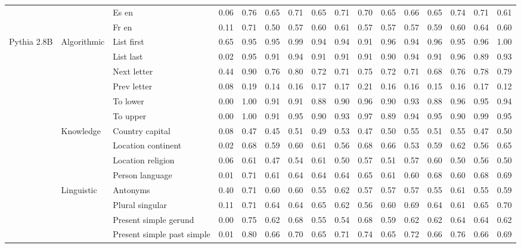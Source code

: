 \begin{center}
\begin{longtable}{lllrrrrrrrrrrrrr}
 &  & Es en & 0.06 & 0.76 & 0.65 & 0.71 & 0.65 & 0.71 & 0.70 & 0.65 & 0.66 & 0.65 & 0.74 & 0.71 & 0.61 \\
 &  & Fr en & 0.11 & 0.71 & 0.50 & 0.57 & 0.60 & 0.61 & 0.57 & 0.57 & 0.57 & 0.59 & 0.60 & 0.64 & 0.60 \\
\cline{1-16} \cline{2-16}
\multirow[t]{18}{*}{Pythia 2.8B} & \multirow[t]{6}{*}{Algorithmic} & List first & 0.65 & 0.95 & 0.95 & 0.99 & 0.94 & 0.94 & 0.91 & 0.96 & 0.94 & 0.96 & 0.95 & 0.96 & 1.00 \\
 &  & List last & 0.02 & 0.95 & 0.91 & 0.94 & 0.91 & 0.91 & 0.91 & 0.90 & 0.94 & 0.91 & 0.96 & 0.89 & 0.93 \\
 &  & Next letter & 0.44 & 0.90 & 0.76 & 0.80 & 0.72 & 0.71 & 0.75 & 0.72 & 0.71 & 0.68 & 0.76 & 0.78 & 0.79 \\
 &  & Prev letter & 0.08 & 0.19 & 0.14 & 0.16 & 0.17 & 0.17 & 0.21 & 0.16 & 0.16 & 0.15 & 0.16 & 0.17 & 0.12 \\
 &  & To lower & 0.00 & 1.00 & 0.91 & 0.91 & 0.88 & 0.90 & 0.96 & 0.90 & 0.93 & 0.88 & 0.96 & 0.95 & 0.94 \\
 &  & To upper & 0.00 & 1.00 & 0.91 & 0.95 & 0.90 & 0.93 & 0.97 & 0.89 & 0.94 & 0.95 & 0.90 & 0.99 & 0.95 \\
\cline{2-16}
 & \multirow[t]{4}{*}{Knowledge} & Country capital & 0.08 & 0.47 & 0.45 & 0.51 & 0.49 & 0.53 & 0.47 & 0.50 & 0.55 & 0.51 & 0.55 & 0.47 & 0.50 \\
 &  & Location continent & 0.02 & 0.68 & 0.59 & 0.60 & 0.61 & 0.56 & 0.68 & 0.66 & 0.53 & 0.59 & 0.62 & 0.56 & 0.65 \\
 &  & Location religion & 0.06 & 0.61 & 0.47 & 0.54 & 0.61 & 0.50 & 0.57 & 0.51 & 0.57 & 0.60 & 0.50 & 0.56 & 0.50 \\
 &  & Person language & 0.01 & 0.71 & 0.61 & 0.64 & 0.64 & 0.64 & 0.65 & 0.61 & 0.60 & 0.68 & 0.60 & 0.68 & 0.69 \\
\cline{2-16}
 & \multirow[t]{4}{*}{Linguistic} & Antonyms & 0.40 & 0.71 & 0.60 & 0.60 & 0.55 & 0.62 & 0.57 & 0.57 & 0.57 & 0.55 & 0.61 & 0.55 & 0.59 \\
 &  & Plural singular & 0.11 & 0.71 & 0.64 & 0.64 & 0.65 & 0.62 & 0.56 & 0.60 & 0.69 & 0.64 & 0.61 & 0.65 & 0.70 \\
 &  & Present simple gerund & 0.00 & 0.75 & 0.62 & 0.68 & 0.55 & 0.54 & 0.68 & 0.59 & 0.62 & 0.62 & 0.64 & 0.64 & 0.62 \\
 &  & Present simple past simple & 0.01 & 0.80 & 0.66 & 0.70 & 0.65 & 0.71 & 0.74 & 0.65 & 0.72 & 0.66 & 0.76 & 0.66 & 0.69 \\

\end{longtable}
\end{center}
